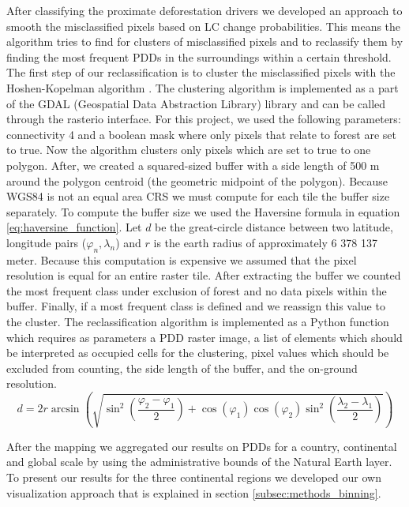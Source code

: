 			After classifying the proximate deforestation drivers we developed an approach to smooth the misclassified pixels based on \ac{LC} change probabilities. This means the algorithm tries to find for clusters of misclassified pixels and to reclassify them by finding the most frequent \acp{PDD} in the surroundings within a certain threshold. The first step of our reclassification is to cluster the misclassified pixels with the Hoshen-Kopelman algorithm \citep{Hoshen1998}. The clustering algorithm is implemented as a part of the GDAL (Geospatial Data Abstraction Library) library and can be called through the rasterio interface. For this project, we used the following parameters: connectivity 4 and a boolean mask where only pixels that relate to forest are set to true. Now the algorithm clusters only pixels which are set to true to one polygon. After, we created a squared-sized buffer with a side length of 500 m around the polygon centroid (the geometric midpoint of the polygon). Because \ac{WGS84} is not an equal area \ac{CRS} we must compute for each tile the buffer size separately. To compute the buffer size we used the Haversine formula in equation \ref{eq:haversine_function}. Let $d$ be the great-circle distance between two latitude, longitude pairs ($\varphi_n, \lambda_n$) and $r$ is the earth radius of approximately 6 378 137 meter. Because this computation is expensive we assumed that the pixel resolution is equal for an entire raster tile. After extracting the buffer we counted the most frequent class under exclusion of forest and no data pixels within the buffer. Finally, if a most frequent class is defined and we reassign this value to the cluster. The reclassification algorithm is implemented as a Python function which requires as parameters a \ac{PDD} raster image, a list of elements which should be interpreted as occupied cells for the clustering, pixel values which should be excluded from counting, the side length of the buffer, and the on-ground resolution. 
			\begin{equation}
			\label{eq:haversine_function}
				d = 2r\arcsin\left(
				\sqrt{
						\sin^2\left(\frac{\varphi_2-\varphi_1}{2}\right)+\cos\left(\varphi_1\right)\cos\left(\varphi_2\right)\sin^2\left(\frac{\lambda_2-\lambda_1}{2}\right)
				}
				\right)
			\end{equation}

			After the mapping we aggregated our results on \acp{PDD} for a country, continental and global scale by using the administrative bounds of the Natural Earth layer. To present our results for the three continental regions we developed our own visualization approach that is explained in section \ref{subsec:methods_binning}.


